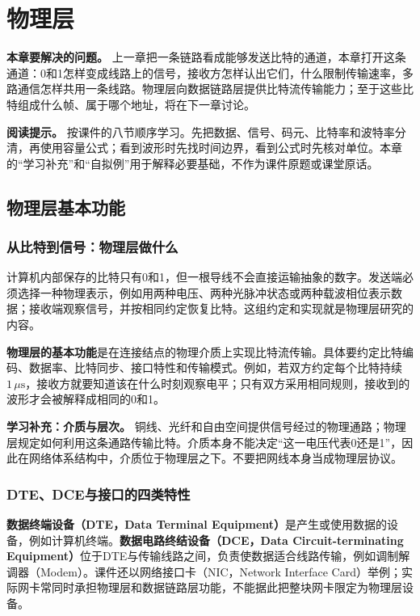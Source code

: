 \chapter{物理层}

\noindent\textbf{本章要解决的问题。} 上一章把一条链路看成能够发送比特的通道，本章打开这条通道：0和1怎样变成线路上的信号，接收方怎样认出它们，什么限制传输速率，多路通信怎样共用一条线路。物理层向数据链路层提供比特流传输能力；至于这些比特组成什么帧、属于哪个地址，将在下一章讨论。

\noindent\textbf{阅读提示。} 按课件的八节顺序学习。先把数据、信号、码元、比特率和波特率分清，再使用容量公式；看到波形时先找时间边界，看到公式时先核对单位。本章的“学习补充”和“自拟例”用于解释必要基础，不作为课件原题或课堂原话。

\section{物理层基本功能}
\subsection{从比特到信号：物理层做什么}
计算机内部保存的比特只有0和1，但一根导线不会直接运输抽象的数字。发送端必须选择一种物理表示，例如用两种电压、两种光脉冲状态或两种载波相位表示数据；接收端观察信号，并按相同约定恢复比特。这组约定和实现就是物理层研究的内容。

\textbf{物理层的基本功能}是在连接结点的物理介质上实现比特流传输。具体要约定比特编码、数据率、比特同步、接口特性和传输模式。例如，若双方约定每个比特持续$1\,\mu\mathrm{s}$，接收方就要知道该在什么时刻观察电平；只有双方采用相同规则，接收到的波形才会被解释成相同的0和1。

\textbf{学习补充：介质与层次。} 铜线、光纤和自由空间提供信号经过的物理通路；物理层规定如何利用这条通路传输比特。介质本身不能决定“这一电压代表0还是1”，因此在网络体系结构中，介质位于物理层之下。不要把网线本身当成物理层协议。

\annotationarea[4]

\subsection{DTE、DCE与接口的四类特性}
\textbf{数据终端设备（DTE，Data Terminal Equipment）}是产生或使用数据的设备，例如计算机终端。\textbf{数据电路终结设备（DCE，Data Circuit-terminating Equipment）}位于DTE与传输线路之间，负责使数据适合线路传输，例如调制解调器（Modem）。课件还以网络接口卡（NIC，Network Interface Card）举例；实际网卡常同时承担物理层和数据链路层功能，不能据此把整块网卡限定为物理层设备。

